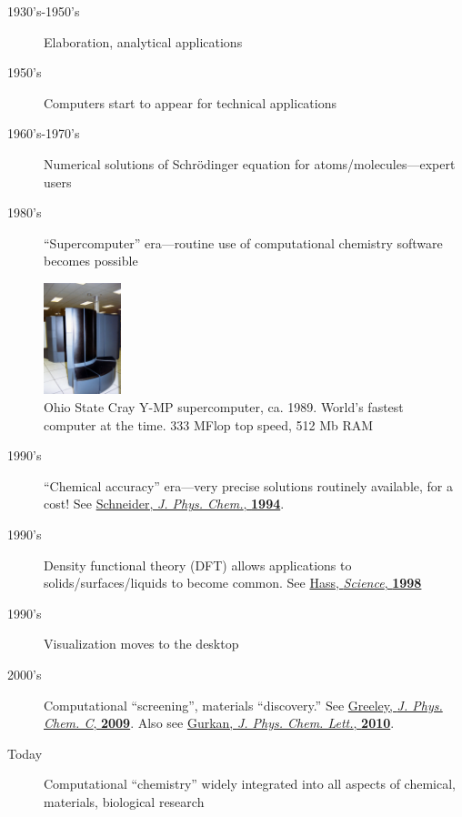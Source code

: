 \documentclass[11pt]{article}
\begin{document}
\begin{description}
\item[{1930's-1950's}] Elaboration, analytical applications

\item[{1950's}] Computers start to appear for technical applications

\item[{1960's-1970's}] Numerical solutions of Schr\"{o}dinger equation for atoms/molecules---expert users

\item[{1980's}] ``Supercomputer'' era---routine use of computational chemistry software becomes possible
\end{description}
\begin{figure}[htb]
\centering
\includegraphics[width=0.2\textwidth]{./Images/CrayYMPb.jpg}
\caption{Ohio State Cray Y-MP supercomputer, ca. 1989.  World's fastest computer at the time.  333 MFlop top speed, 512 Mb RAM}
\end{figure}

\begin{description}
\item[{1990's}] ``Chemical accuracy'' era---very precise solutions routinely available, for a cost!  See \href{http://www.crc.nd.edu/~wschnei1/courses/CBE_547/Resources/1994_WFS_JPC.pdf}{Schneider, \emph{J. Phys. Chem.}, \textbf{1994}}.

\item[{1990's}] Density functional theory (DFT) allows applications to solids/surfaces/liquids to become common. See \href{http://www.crc.nd.edu/~wschnei1/courses/CBE_547/Resources/1998_Hass_Science.pdf}{Hass, \emph{Science}, \textbf{1998}}

\item[{1990's}] Visualization moves to the desktop

\item[{2000's}] Computational ``screening'', materials ``discovery.'' See \href{http://www.crc.nd.edu/~wschnei1/courses/CBE_547/Resources/2009_Greeley_JPCC.pdf}{Greeley, \emph{J. Phys. Chem. C}, \textbf{2009}}.  Also see \href{http://www.crc.nd.edu/~wschnei1/courses/CBE_547/Resources/2010_Gurkan_JPCL.pdf}{Gurkan, \emph{J. Phys. Chem. Lett.}, \textbf{2010}}.

\item[{Today}] Computational ``chemistry'' widely integrated into all aspects of chemical, materials, biological research
\end{description}
\end{document}
